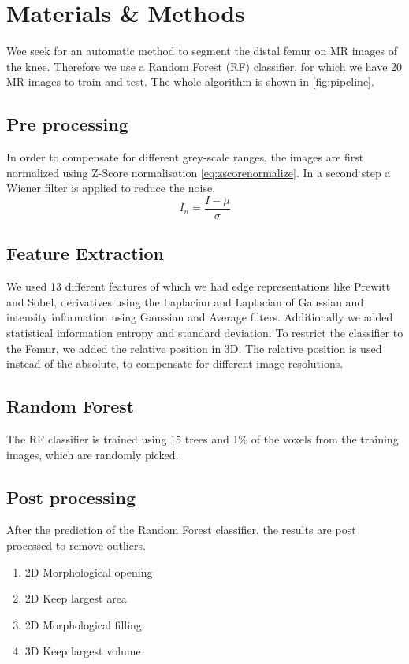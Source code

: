 \section{Materials \& Methods}
Wee seek for an automatic method to segment the distal femur on MR images of the knee. Therefore we use a Random Forest (RF) classifier, for which we have 20 MR images to train and test. The whole algorithm is shown in \autoref{fig:pipeline}.
\subsection{Pre processing}
In order to compensate for different grey-scale ranges, the images are first normalized using Z-Score normalisation \autoref{eq:zscorenormalize}. In a second step a Wiener filter is applied to reduce the noise. 
\begin{equation}
I_n = \frac{I - \mu}{\sigma}
\label{eq:zscorenormalize}
\end{equation}
\subsection{Feature Extraction}
We used 13 different features of which we had edge representations like Prewitt and Sobel, derivatives using the Laplacian and Laplacian of Gaussian and intensity information using Gaussian and Average filters. Additionally we added statistical information entropy and standard deviation. To restrict the classifier to the Femur, we added the relative position in 3D. The relative position is used instead of the absolute, to compensate for different image resolutions.
\subsection{Random Forest}
The RF classifier is trained using 15 trees and 1\% of the voxels from the training images, which are randomly picked. 
\subsection{Post processing}
After the prediction of the Random Forest classifier, the results are post processed to remove outliers. 
\begin{enumerate}
\item 2D Morphological opening
\item 2D Keep largest area
\item 2D Morphological filling
\item 3D Keep largest volume
\end{enumerate}

